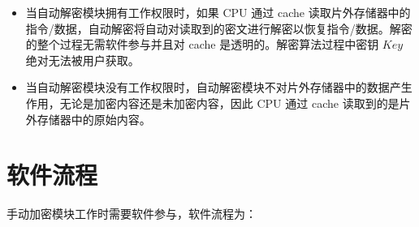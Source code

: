 \documentclass[main\_\_CN.tex]{subfiles}
\begin{document}
\begin{tiplisting}
\vspace{-2em}
\begin{itemize}

\item 当自动解密模块拥有工作权限时，如果 CPU 通过 cache 读取片外存储器中的指令/数据，自动解密将自动对读取到的密文进行解密以恢复指令/数据。解密的整个过程无需软件参与并且对 cache 是透明的。解密算法过程中密钥 \begin{math}Key\end{math} 绝对无法被用户获取。

\item 当自动解密模块没有工作权限时，自动解密模块不对片外存储器中的数据产生作用，无论是加密内容还是未加密内容，因此 CPU 通过 cache 读取到的是片外存储器中的原始内容。

\end{itemize}
\end{tiplisting}


\section{ 软件流程 }
手动加密模块工作时需要软件参与，软件流程为：
\end{document}
